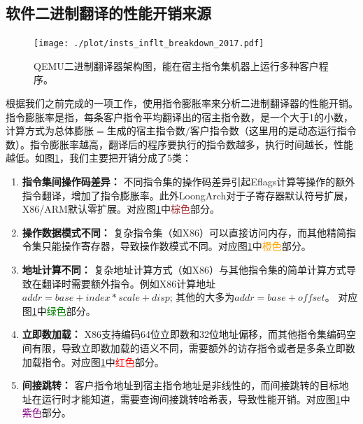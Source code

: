 \documentclass{Style/ucasproposal}%
\begin{document}
\subsection{软件二进制翻译的性能开销来源}

\begin{figure}[h]
  \centering
  \texttt{[image: ./plot/insts\_inflt\_breakdown\_2017.pdf]}
  \caption{QEMU二进制翻译器架构图，能在宿主指令集机器上运行多种客户程序。}
  \label{img:insts_inflt_breakdown_2017}
\end{figure}

根据我们之前完成的一项工作，使用指令膨胀率来分析二进制翻译器的性能开销。指令膨胀率是指，每条客户指令平均翻译出的宿主指令数，是一个大于1的小数，计算方式为$\mbox{总体膨胀} = \mbox{生成的宿主指令数} / \mbox{客户指令数}$（这里用的是动态运行指令数）。指令膨胀率越高，翻译后的程序要执行的指令数越多，执行时间越长，性能越低。如图\ref{img:insts_inflt_breakdown_2017}，我们主要把开销分成了5类：

\begin{enumerate}
  \item \textbf{指令集间操作码差异：} 不同指令集的操作码差异引起Eflags计算等操作的额外指令翻译，增加了指令膨胀率。此外LoongArch对于子寄存器默认符号扩展，X86/ARM默认零扩展。对应图\ref{img:insts_inflt_breakdown_2017}中\textcolor{brown}{棕色}部分。
  
  \item \textbf{操作数据模式不同：} 复杂指令集（如X86）可以直接访问内存，而其他精简指令集只能操作寄存器，导致操作数模式不同。对应图\ref{img:insts_inflt_breakdown_2017}中\textcolor{orange}{橙色}部分。
  
  \item \textbf{地址计算不同：} 复杂地址计算方式（如X86）与其他指令集的简单计算方式导致在翻译时需要额外指令。例如X86计算地址$addr = base + index * scale +disp$; 其他的大多为$addr = base + offset$。 对应图\ref{img:insts_inflt_breakdown_2017}中\textcolor{green}{绿色}部分。
  
  \item \textbf{立即数加载：} X86支持编码64位立即数和32位地址偏移，而其他指令集编码空间有限，导致立即数加载的语义不同，需要额外的访存指令或者是多条立即数加载指令。对应图\ref{img:insts_inflt_breakdown_2017}中\textcolor{red}{红色}部分。
  
  \item \textbf{间接跳转：} 客户指令地址到宿主指令地址是非线性的，而间接跳转的目标地址在运行时才能知道，需要查询间接跳转哈希表，导致性能开销。对应图\ref{img:insts_inflt_breakdown_2017}中\textcolor{purple}{紫色}部分。
  
\end{enumerate}
\end{document}

